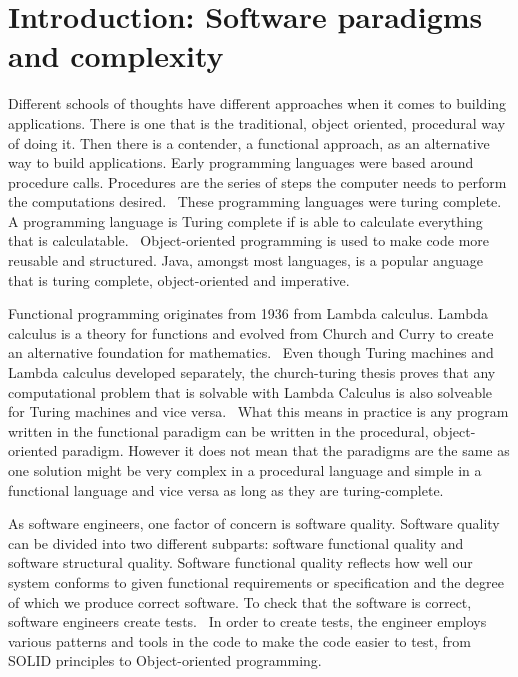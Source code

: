 \chapter{Introduction: Software paradigms and complexity}\label{introduction}

Different schools of thoughts have different approaches when it comes to
building applications. There is one that is the traditional, object oriented,
procedural way of doing it. Then there is a contender, a functional approach, as
an alternative way to build applications.  Early programming languages were
based around procedure calls. Procedures are the series of steps the computer
needs to perform the computations desired.~\cite{proceduralprogramming} These
programming languages were turing complete. A programming language is Turing
complete if is able to calculate everything that is
calculatable.~\cite{turingmachine} Object-oriented programming is used to make
code more reusable and structured. Java, amongst most languages, is a popular
anguage that is turing complete, object-oriented and imperative.~\cite{java} 

Functional programming originates from 1936 from Lambda calculus. Lambda
calculus is a theory for functions and evolved from Church and Curry to create
an alternative foundation for mathematics.~\cite{Turner} Even though Turing
machines and Lambda calculus developed separately, the church-turing thesis
proves that any computational problem that is solvable with Lambda Calculus is
also solveable for Turing machines and vice versa.~\cite{sep-church-turing} What
this means in practice is any program written in the functional paradigm can be
written in the procedural, object-oriented paradigm. However it does not mean
that the paradigms are the same as one solution might be very complex in a
procedural language and simple in a functional language and vice versa as long
as they are turing-complete.

As software engineers, one factor of concern is software quality. Software
quality can be divided into two different subparts: software functional quality
and software structural quality. Software functional quality reflects how well
our system conforms to given functional requirements or specification and the
degree of which we produce correct software.  To check that the software is
correct, software engineers create tests.~\cite{Pressman:2004:SEP:994110} In
order to create tests, the engineer employs various patterns and tools in the
code to make the code easier to test, from SOLID principles to Object-oriented
programming.

